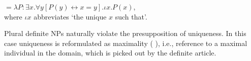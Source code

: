 \documentclass[output=paper]{langscibook}
\begin{document}
\ea \label{ex:seres:20}
 $= \lambda P:\exists x. \forall y [P(y)\leftrightarrow x = y]. \iota x.P(x)$,\\
\glt where $\iota x$ abbreviates `the unique $x$ such that'.
\z




\noindent Plural definite NPs naturally violate the presupposition of uniqueness. In this case uniqueness is reformulated as maximality (%
\citealt{Sharvy1980,Link1983}), i.e., reference to a maximal individual in the domain, which is picked out by the definite article.

\end{document}
